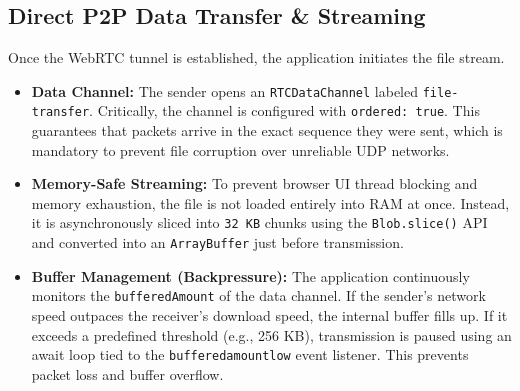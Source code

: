 \documentclass[12pt, a4paper]{article}
\begin{document}
\subsection{Direct P2P Data Transfer \& Streaming}
Once the WebRTC tunnel is established, the application initiates the file stream.
\begin{itemize}
    \item \textbf{Data Channel:} The sender opens an \texttt{RTCDataChannel} labeled \texttt{file-transfer}. Critically, the channel is configured with \texttt{ordered: true}. This guarantees that packets arrive in the exact sequence they were sent, which is mandatory to prevent file corruption over unreliable UDP networks.
    \item \textbf{Memory-Safe Streaming:} To prevent browser UI thread blocking and memory exhaustion, the file is not loaded entirely into RAM at once. Instead, it is asynchronously sliced into \texttt{32 KB} chunks using the \texttt{Blob.slice()} API and converted into an \texttt{ArrayBuffer} just before transmission.
    \item \textbf{Buffer Management (Backpressure):} The application continuously monitors the \texttt{bufferedAmount} of the data channel. If the sender's network speed outpaces the receiver's download speed, the internal buffer fills up. If it exceeds a predefined threshold (e.g., 256 KB), transmission is paused using an await loop tied to the \texttt{bufferedamountlow} event listener. This prevents packet loss and buffer overflow.
\end{itemize}
\end{document}
